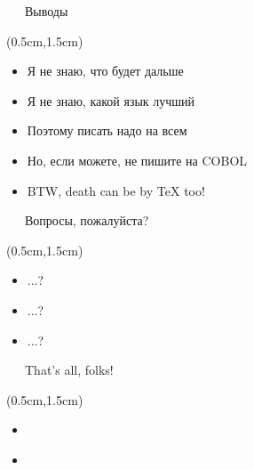 \documentclass[xetex,18pt,aspectratio=43]{beamer}
\begin{document}
\begin{Large}
\begin{frame}{\ \ \ Выводы}
\begin{textblock*}{\framewidth-0.8cm}(0.5cm,1.5cm) %
\begin{itemize}
  \item Я не знаю, что будет дальше
  \item Я не знаю, какой язык лучший
  \item Поэтому писать надо на всем
  \item Но, если можете, не пишите на COBOL
  \item BTW, death can be by {\TeX} too!
\end{itemize}
\end{textblock*}
\end{frame}

\begin{frame}{\ \ \ Вопросы, пожалуйста?}
\begin{textblock*}{\framewidth-0.8cm}(0.5cm,1.5cm)
\begin{itemize}
  \item ...?
  \item ...?
  \item ...?
\end{itemize}
\end{textblock*}
\end{frame}

\begin{frame}{\ \ \ That's all, folks!}
\begin{textblock*}{\framewidth-0.8cm}(0.5cm,1.5cm)
\begin{itemize}
  \item \href{mailto:alex@gitinsky.com}{\color{blue}{alex@gitinsky.com}}
  \item \href{https://telegram.me/lhommequipleure}{\color{blue}{https://telegram.me/lhommequipleure}}
\end{itemize}
\end{textblock*}
\end{frame}
\end{Large}
\end{document}

